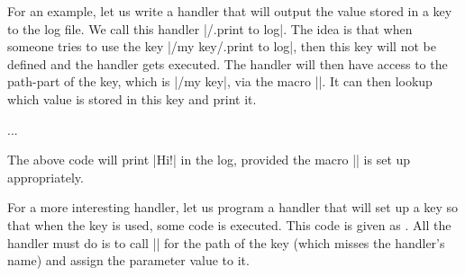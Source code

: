 For an example, let us write a handler that will output the value stored in a
key to the log file. We call this handler |/.print to log|. The idea is that
when someone tries to use the key |/my key/.print to log|, then this key will
not be defined and the handler gets executed. The handler will then have access
to the path-part of the key, which is |/my key|, via the macro
|\pgfkeyscurrentpath|. It can then lookup which value is stored in this key and
print it.
%
\begin{codeexample}
{%
  \pgfkeysgetvalue{\pgfkeyscurrentpath}{\temp}
  \writetolog{\temp}
}
...
\end{codeexample}
%
The above code will print |Hi!| in the log, provided the macro |\writetolog| is
set up appropriately.

For a more interesting handler, let us program a handler that will set up a key
so that when the key is used, some code is executed. This code is given as
. All the handler must do is to call |\pgfkeysdef| for the path of
the key (which misses the handler's name) and assign the parameter value to it.
%
\begin{codeexample}[]
\end{codeexample}

